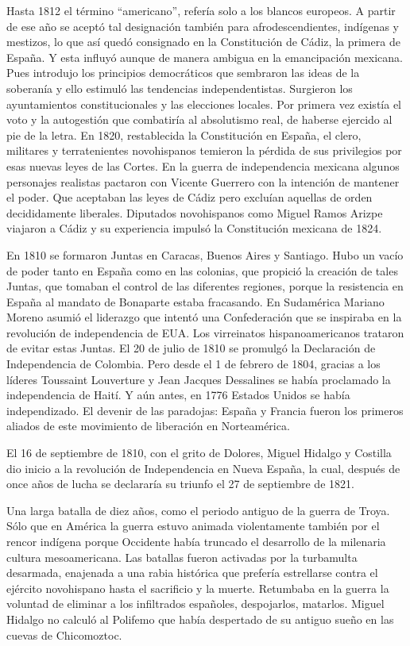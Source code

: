 Hasta 1812 el término “americano”, refería
solo a los blancos europeos. A partir de ese
año se aceptó tal designación también para
afrodescendientes, indígenas y mestizos, lo
que así quedó consignado en la Constitución
de Cádiz, la primera de España. Y esta
influyó aunque de manera ambigua en la
emancipación mexicana. Pues introdujo los
principios democráticos que sembraron las
ideas de la soberanía y ello estimuló las
tendencias independentistas. Surgieron los
ayuntamientos constitucionales y las
elecciones locales. Por primera vez existía
el voto y la autogestión que combatiría al
absolutismo real, de haberse ejercido al pie
de la letra. En 1820, restablecida la
Constitución en España, el clero, militares y
terratenientes novohispanos temieron la
pérdida de sus privilegios por esas nuevas
leyes de las Cortes. En la guerra de
independencia mexicana algunos personajes
realistas pactaron con Vicente Guerrero con
la intención de mantener el poder. Que
aceptaban las leyes de Cádiz pero excluían
aquellas de orden decididamente liberales.
Diputados novohispanos como Miguel Ramos
Arizpe viajaron a Cádiz y su experiencia
impulsó la Constitución mexicana de 1824.

En 1810 se formaron Juntas en Caracas, Buenos
Aires y Santiago. Hubo un vacío de poder
tanto en España como en las colonias, que
propició la creación de tales Juntas, que
tomaban el control de las diferentes
regiones, porque la resistencia en España al
mandato de Bonaparte estaba fracasando. En
Sudamérica Mariano Moreno asumió el liderazgo
que intentó una Confederación que se
inspiraba en la revolución de independencia
de EUA. Los virreinatos hispanoamericanos
trataron de evitar estas Juntas. El 20 de
julio de 1810 se promulgó la Declaración de
Independencia de Colombia. Pero desde el 1 de
febrero de 1804, gracias a los líderes
Toussaint Louverture y Jean Jacques
Dessalines se había proclamado la
independencia de Haití. Y aún antes, en 1776
Estados Unidos se había independizado. El
devenir de las paradojas: España y Francia
fueron los primeros aliados de este
movimiento de liberación en Norteamérica.

El 16 de septiembre de 1810, con el grito de
Dolores, Miguel Hidalgo y Costilla dio inicio
a la revolución de Independencia en Nueva
España, la cual, después de once años de
lucha se declararía su triunfo el 27 de
septiembre de 1821.

Una larga batalla de diez años, como el
periodo antiguo de la guerra de Troya. Sólo
que en América la guerra estuvo animada
violentamente también por el rencor indígena
porque Occidente había truncado el desarrollo
de la milenaria cultura mesoamericana. Las
batallas fueron activadas por la turbamulta
desarmada, enajenada a una rabia histórica
que prefería estrellarse contra el ejército
novohispano hasta el sacrificio y la muerte.
Retumbaba en la guerra la voluntad de
eliminar a los infiltrados españoles,
despojarlos, matarlos. Miguel Hidalgo no
calculó al Polifemo que había despertado de
su antiguo sueño en las cuevas de
Chicomoztoc.

